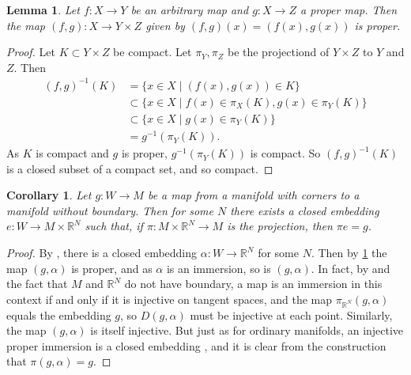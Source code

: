 \documentclass[12pt]{article}
\theoremstyle{plain}
\newtheorem{corollary}[theorem]{Corollary}
\newtheorem{lemma}[theorem]{Lemma}
\theoremstyle{definition}
\theoremstyle{remark}
\newcommand{\R}{\mathbb{R}}
\begin{document}
\begin{lemma}\label{L: proper product}
	Let $f \colon X \to Y$ be an arbitrary map and $g \colon X \to Z$ a proper map. 
	Then the map $(f,g) \colon X \to Y \times Z$ given by $(f,g)(x)=(f(x),g(x))$ is proper.
\end{lemma}
\begin{proof}
	Let $K \subset Y \times Z$ be compact. 
	Let $\pi_Y,\pi_Z$ be the projectiond of $Y \times Z$ to $Y$ and $Z$. Then 
	\begin{align*}
		(f,g)^{-1}(K) &= \{x \in X \mid (f(x),g(x)) \in K \}\\
		&\subset \{ x \in X \mid f(x) \in \pi_X(K), g(x) \in \pi_Y(K)\}\\
		&\subset \{ x \in X \mid g(x) \in \pi_Y(K)\}\\
		&= g^{-1}(\pi_Y(K)).
	\end{align*} 
	As $K$ is compact and $g$ is proper, $g^{-1}(\pi_Y(K))$ is compact. 
	So $(f,g)^{-1}(K)$ is a closed subset of a compact set, and so compact.
\end{proof}

\begin{corollary}\label{C: embed V}
Let $g \colon W \to M$ be a map from a manifold with corners to a manifold without boundary. 
Then for some $N$ there exists a closed embedding $e \colon W \to M \times \R^N$ such that, if $\pi \colon M \times \R^N \to M$ is the projection, then $\pi e = g$. 
\end{corollary}
\begin{proof}
By \cite[Corollary 11.3.10]{MaDo92}, there is a closed embedding $\alpha \colon W \to \R^N$ for some $N$. 
Then by \cref{L: proper product} the map $(g,\alpha)$ is proper, and as $\alpha$ is an immersion, so is $(g,\alpha)$.
In fact, by \cite[Theorem 3.2.6]{MaDo92} and the fact that $M$ and $\R^N$ do not have boundary, a map is an immersion in this context if and only if it is injective on tangent spaces, and the map $\pi_{\R^N}(g,\alpha)$ equals the embedding $g$, so $D(g,\alpha)$ must be injective at each point.
Similarly, the map $(g,\alpha)$ is itself  injective.  
But just as for ordinary manifolds, an injective proper immersion is a closed embedding \cite[Proposition 3.3.4]{MaDo92}, and it is clear from the construction that $\pi (g,\alpha) = g$.
\end{proof}




\end{document}
